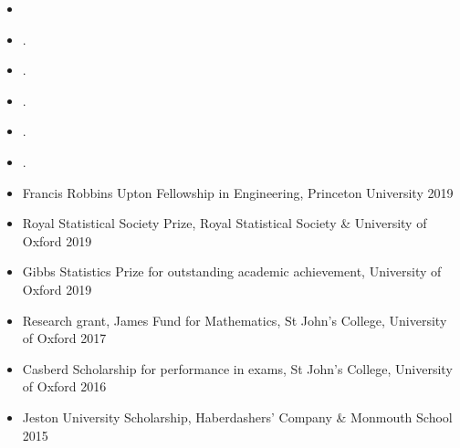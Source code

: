\documentclass[
  date,
  number,
]{wgu-cv}
\begin{document}
\begin{itemize}
\item {}
\end{itemize}


\begin{itemize}
\item {}.
\end{itemize}


\begin{itemize}
  \item {}.
  \item {}.
\end{itemize}


\pagebreak
{}
\begin{itemize}
  \item {}.
  \item {}.
\end{itemize}



\begin{itemize}
  \item Francis Robbins Upton Fellowship in Engineering,
    Princeton University
    \hfill 2019%
  \item Royal Statistical Society Prize,
    Royal Statistical Society \& University of Oxford
    \hfill 2019%
  \item Gibbs Statistics Prize for outstanding academic achievement,
    University of Oxford
    \hfill 2019%
	\item Research grant, James Fund for Mathematics,
    St John's College, University of Oxford
    \hfill 2017%
	\item Casberd Scholarship for performance in exams,
    St John's College, University of Oxford
    \hfill 2016%
  \item Jeston University Scholarship,
    Haberdashers' Company \& Monmouth School
    \hfill 2015%
\end{itemize}
\end{document}
